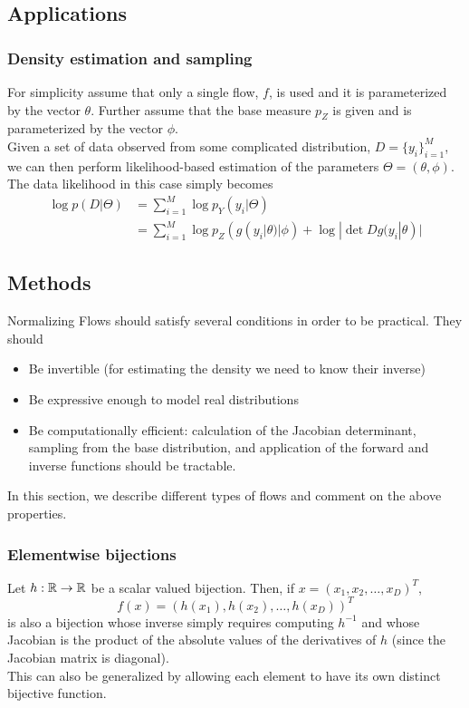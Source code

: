 \documentclass[11pt]{article}
\begin{document}
\subsection{Applications}
\subsubsection{Density estimation and sampling}
For simplicity assume that only a single flow, $f$, is used and it is parameterized by the vector $\theta$. Further assume that the base measure $p_Z$ is given and is parameterized by the vector $\phi$.\\
Given a set of data observed from some complicated distribution, $D = \{y_i\}_{i=1}^M$, we can then perform likelihood-based estimation of the parameters $\Theta = (\theta, \phi)$. The data likelihood in this case simply becomes
\begin{align*}
	\log p(D|\Theta) &= \sum_{i=1}^M \log p_Y(y_i|\Theta) \\
	&= \sum_{i=1}^M \log p_Z(g(y_i|\theta)|\phi) + \log |\det Dg(y_i|\theta)|
\end{align*}

\subsection{Methods}
Normalizing Flows should satisfy several conditions in order to be practical. They should
\begin{itemize}
	\item Be invertible (for estimating the density we need to know their inverse)
	\item Be expressive enough to model real distributions
	\item Be computationally efficient: calculation of the Jacobian determinant, sampling from the base distribution, and application of the forward and inverse functions should be tractable.
\end{itemize}
In this section, we describe different types of flows and comment on the above properties.
\subsubsection{Elementwise bijections}
Let $h: \mathbb{R} \rightarrow \mathbb{R}$ be a scalar valued bijection. Then, if $x = (x_1, x_2, \hdots, x_D)^T$,
$$f(x) = (h(x_1), h(x_2), \hdots, h(x_D))^T$$
is also a bijection whose inverse simply requires computing $h^{-1}$ and whose Jacobian is the product of the absolute values of the derivatives of $h$ (since the Jacobian matrix is diagonal).\\
This can also be generalized by allowing each element to have its own distinct bijective function.
\end{document}
